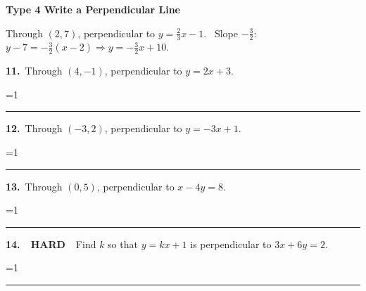 \documentclass[11pt,letterpaper]{article}
\newcommand{\leveltag}[2]{\colorbox{#1}{\color{white}\bfseries\scriptsize\ #2\ }}
\newcommand{\LH}{\leveltag{fmmistake}{HARD}}
\newcommand{\topicbar}[1]{\needspace{4.5cm}\par\vspace{5mm}
  \begin{tcolorbox}[enhanced,colback=fmtitle,colframe=fmtitle,arc=2mm,left=4mm,top=1.5mm,bottom=1.5mm]
  \color{white}\bfseries\large #1
  \end{tcolorbox}}
\providecommand{\iskey}{0}
\newcommand{\pans}[2][3.2cm]{\ifnum\iskey=1 \underline{\makebox[#1][c]{\color{fmmistake}\bfseries #2}}\else\rule{#1}{0.4pt}\fi}
\newcommand{\algp}[3]{\begin{minipage}[t][4.6cm]{0.48\linewidth}{\color{fmturn}\bfseries #1.}\ #2\par\vfill\hfill \pans[4.2cm]{#3}\end{minipage}}
\newlength{\pw}
\renewcommand{\pans}[2][3.2cm]{\ifnum\iskey=1 \settowidth{\pw}{\bfseries #2}\ifdim\pw>#1 \parbox[b]{#1}{\raggedleft\color{fmmistake}\bfseries\small #2}\else\underline{\makebox[#1][c]{\color{fmmistake}\bfseries #2}}\fi\else\rule{#1}{0.4pt}\fi}
\begin{document}
\needspace{6cm}\topicbar{Type 4 \quad Write a Perpendicular Line}
\begin{watchme}Through $(2, 7)$, perpendicular to $y = \tfrac23 x - 1$. \ Slope $-\tfrac32$: $y - 7 = -\tfrac32(x - 2) \Rightarrow y = -\tfrac32 x + 10$.\end{watchme}
\needspace{4.6cm}\noindent\algp{11}{Through $(4, -1)$, perpendicular to $y = 2x + 3$.}{$y = -\tfrac12 x + 1$}\hfill\algp{12}{Through $(-3, 2)$, perpendicular to $y = -3x + 1$.}{$y = \tfrac13 x + 3$}\par\vspace{2mm}
\needspace{4.6cm}\noindent\algp{13}{Through $(0, 5)$, perpendicular to $x - 4y = 8$.}{$y = -4x + 5$}\hfill\algp{14}{\LH\ Find $k$ so that $y = kx + 1$ is perpendicular to $3x + 6y = 2$.}{$k = 2$}\par
\end{document}

